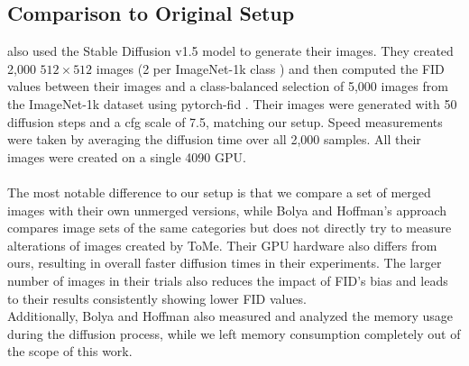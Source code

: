 \subsection{Comparison to Original Setup}
\cite{bolya2023tomesd} also used the Stable Diffusion v1.5 model to generate their images. They created 2,000 $512 \times 512$ images (2 per ImageNet-1k class \cite{deng2009imagenet}) and then computed the FID values between their images and a class-balanced selection of 5,000 images from the ImageNet-1k dataset using pytorch-fid \cite{Seitzer2020FID}. Their images were generated with 50 diffusion steps and a cfg scale of 7.5, matching our setup. Speed measurements were taken by averaging the diffusion time over all 2,000 samples. All their images were created on a single 4090 GPU.\\
\\
The most notable difference to our setup is that we compare a set of merged images with their own unmerged versions, while Bolya and Hoffman's approach compares image sets of the same categories but does not directly try to measure alterations of images created by ToMe. Their GPU hardware also differs from ours, resulting in overall faster diffusion times in their experiments. The larger number of images in their trials also reduces the impact of FID's bias and leads to their results consistently showing lower FID values.\\
Additionally, Bolya and Hoffman also measured and analyzed the memory usage during the diffusion process, while we left memory consumption completely out of the scope of this work.
